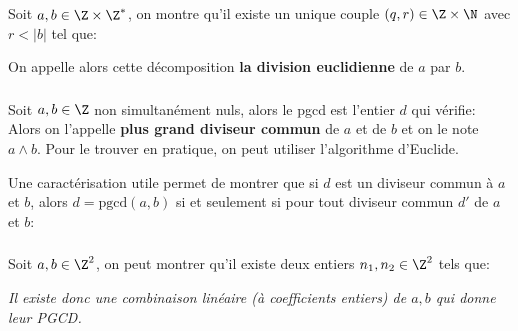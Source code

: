 \chapter*{}

\subsection*{}
Soit \(a, b \in \Z \times \Z^*\), on montre qu'il existe un unique couple \((q, r) \in \Z \times \N\) avec \(r < |b|\) tel que:

On appelle alors cette décomposition \textbf{la division euclidienne} de \(a\) par \(b\).

\subsection*{}

Soit \(a, b \in \Z\) non simultanément nuls, alors le pgcd est l'entier \(d\) qui vérifie:
Alors on l'appelle \textbf{plus grand diviseur commun} de \(a\) et de \(b\) et on le note \(a \wedge b\). Pour le trouver en pratique, on peut utiliser l'algorithme d'Euclide. \<

Une caractérisation utile permet de montrer que si \(d\) est un diviseur commun à \(a\) et \(b\), alors \(d = \text{pgcd}(a , b)\) si et seulement si pour tout diviseur commun \(d'\) de \(a\) et \(b\):

\subsection*{}
Soit \(a, b\in \Z^2\), on peut montrer qu'il existe deux entiers \(n_1, n_2 \in \Z^2\) tels que:
\begin{center}
   \textit{
       Il existe donc une combinaison linéaire (à coefficients entiers) de \(a, b\) qui donne leur PGCD.
   }
\end{center}

